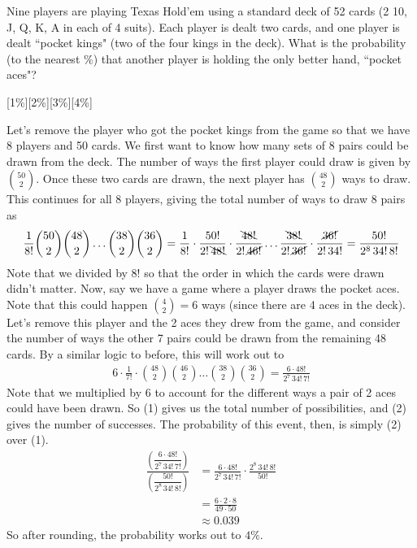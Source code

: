 \documentclass[12pt]{article}
\newcounter{problem}
\begin{document}
\begin{problem}
   Nine players are playing Texas Hold'em using a standard deck of 52 cards (2 10, J, Q, K, A in each of 4 suits). Each player is dealt two cards, and one player is dealt ``pocket kings" (two of the four kings in the deck). What is the probability (to the nearest \%) that another player is holding the only better hand, ``pocket aces"? \par
\end{problem}
[1\%][2\%][3\%][4\%]
\begin{solution}[E]
   Let's remove the player who got the pocket kings from the game so that we have 8 players and 50 cards. We first want to know how many sets of 8 pairs could be drawn from the deck. The number of ways the first player could draw is given by $\binom{50}{2}$. Once these two cards are drawn, the next player has $\binom{48}{2}$ ways to draw. This continues for all 8 players, giving the total number of ways to draw 8 pairs as
    \begin{align} \setcounter{equation}{0}
        \frac{1}{8!}\binom{50}{2}\binom{48}{2}\dots\binom{38}{2}\binom{36}{2}
        =\frac{1}{8!}\cdot\frac{50!}{2!\,\bcancel{48!}}\cdot\frac{\bcancel{48!}}{2!\,\cancel{46!}}\dots\frac{\bcancel{38!}}{2!\,\cancel{36!}}\cdot\frac{\cancel{36!}}{2!\,34!}
        = \frac{50!}{2^8\,34!\,8!}
    \end{align}
    Note that we divided by 8! so that the order in which the cards were drawn didn't matter.\medbreak
    Now, say we have a game where a player draws the pocket aces. Note that this could happen $\binom{4}{2}=6$ ways (since there are 4 aces in the deck). Let's remove this player and the 2 aces they drew from the game, and consider the number of ways the other 7 pairs could be drawn from the remaining 48 cards. By a similar logic to before, this will work out to
    \begin{align}
        6\cdot\frac{1}{7!}\cdot\binom{48}{2}\binom{46}{2}\dots\binom{38}{2}\binom{36}{2}
        = \frac{6\cdot48!}{2^7\,34!\,7!}
    \end{align}
    Note that we multiplied by 6 to account for the different ways a pair of 2 aces could have been drawn. So (1) gives us the total number of possibilities, and (2) gives the number of successes. The probability of this event, then, is simply (2) over (1).
    \begin{align*}
        \frac{\left(\dfrac{6\cdot48!}{2^7\,34!\,7!}\right)}{\left(\dfrac{50!}{2^8\,34!\,8!}\right)} &= \frac{6\cdot48!}{2^7\,34!\,7!} \cdot \frac{2^8\,34!\,8!}{50!} \\
        &=\frac{6\cdot2\cdot8}{49\cdot50} \\[2mm]
        &\approx 0.039
    \end{align*}
    So after rounding, the probability works out to $\boxed{4\%}$.
\end{solution}
\end{document}
